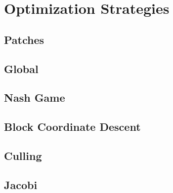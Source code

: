 \chapter{Optimization Strategies}

\section{Patches}

\section{Global}

\section{Nash Game}

\section{Block Coordinate Descent}

\section{Culling}

\section{Jacobi}
